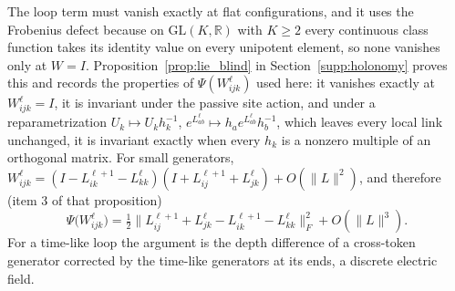 \documentclass[twoside,11pt]{article}
\begin{document}
The loop term must vanish exactly at flat configurations, and it uses the Frobenius defect because on $\mathrm{GL}(K,\mathbb R)$ with $K\ge2$ every continuous class function takes its identity value on every unipotent element, so none vanishes only at $W=I$. Proposition~\ref{prop:lie_blind} in Section~\ref{supp:holonomy} proves this and records the properties of $\Psi(W_{ijk}^\ell)$ used here: it vanishes exactly at $W_{ijk}^\ell=I$, it is invariant under the passive site action, and under a reparametrization $U_k\mapsto U_kh_k^{-1}$, $e^{L_{ab}^\ell}\mapsto h_ae^{L_{ab}^\ell}h_b^{-1}$, which leaves every local link unchanged, it is invariant exactly when every $h_k$ is a nonzero multiple of an orthogonal matrix. For small generators, $W_{ijk}^\ell=(I-L_{ik}^{\ell+1}-L_{kk}^\ell)(I+L_{ij}^{\ell+1}+L_{jk}^\ell)+O(\|L\|^2)$, and therefore (item 3 of that proposition)
\begin{equation}
\Psi\bigl(W_{ijk}^\ell\bigr)=\tfrac12\bigl\|L_{ij}^{\ell+1}+L_{jk}^\ell-L_{ik}^{\ell+1}-L_{kk}^\ell\bigr\|_F^2+O(\|L\|^3).
\label{eq:lie_loop_expansion}
\end{equation}
For a time-like loop the argument is the depth difference of a cross-token generator corrected by the time-like generators at its ends, a discrete electric field.
\end{document}

